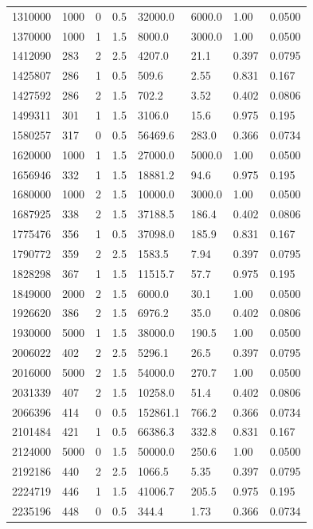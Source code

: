\documentclass[preview]{standalone}
\begin{document}
{{\begin{tabular}{L{1.2cm}C{1.2cm} C{0.3cm}C{0.5cm} C{1.4cm}C{1.4cm} C{1.4cm}C{1.4cm}}
  1310000  &  1000  & 0     & 0.5 &  32000.0  & 6000.0  & 1.00 &  0.0500   \\ 
  1370000  &  1000  & 1     & 1.5 &  8000.0  & 3000.0  & 1.00 &  0.0500   \\ 
  1412090  &   283  & 2     & 2.5 &  4207.0  & 21.1  & 0.397 &  0.0795   \\ 
  1425807  &   286  & 1     & 0.5 &  509.6  & 2.55  & 0.831 &  0.167   \\ 
  1427592  &   286  & 2     & 1.5 &  702.2  & 3.52  & 0.402 &  0.0806   \\ 
  1499311  &   301  & 1     & 1.5 &  3106.0  & 15.6  & 0.975 &  0.195   \\ 
  1580257  &   317  & 0     & 0.5 &  56469.6  & 283.0  & 0.366 &  0.0734   \\ 
  1620000  &  1000  & 1     & 1.5 &  27000.0  & 5000.0  & 1.00 &  0.0500   \\ 
  1656946  &   332  & 1     & 1.5 &  18881.2  & 94.6  & 0.975 &  0.195   \\ 
  1680000  &  1000  & 2     & 1.5 &  10000.0  & 3000.0  & 1.00 &  0.0500   \\ 
  1687925  &   338  & 2     & 1.5 &  37188.5  & 186.4  & 0.402 &  0.0806   \\ 
  1775476  &   356  & 1     & 0.5 &  37098.0  & 185.9  & 0.831 &  0.167   \\ 
  1790772  &   359  & 2     & 2.5 &  1583.5  & 7.94  & 0.397 &  0.0795   \\ 
  1828298  &   367  & 1     & 1.5 &  11515.7  & 57.7  & 0.975 &  0.195   \\ 
  1849000  &  2000  & 2     & 1.5 &  6000.0  & 30.1  & 1.00 &  0.0500   \\ 
  1926620  &   386  & 2     & 1.5 &  6976.2  & 35.0  & 0.402 &  0.0806   \\ 
  1930000  &  5000  & 1     & 1.5 &  38000.0  & 190.5  & 1.00 &  0.0500   \\ 
  2006022  &   402  & 2     & 2.5 &  5296.1  & 26.5  & 0.397 &  0.0795   \\ 
  2016000  &  5000  & 2     & 1.5 &  54000.0  & 270.7  & 1.00 &  0.0500   \\ 
  2031339  &   407  & 2     & 1.5 &  10258.0  & 51.4  & 0.402 &  0.0806   \\ 
  2066396  &   414  & 0     & 0.5 &  152861.1  & 766.2  & 0.366 &  0.0734   \\ 
  2101484  &   421  & 1     & 0.5 &  66386.3  & 332.8  & 0.831 &  0.167   \\ 
  2124000  &  5000  & 0     & 1.5 &  50000.0  & 250.6  & 1.00 &  0.0500   \\ 
  2192186  &   440  & 2     & 2.5 &  1066.5  & 5.35  & 0.397 &  0.0795   \\ 
  2224719  &   446  & 1     & 1.5 &  41006.7  & 205.5  & 0.975 &  0.195   \\ 
  2235196  &   448  & 0     & 0.5 &  344.4  & 1.73  & 0.366 &  0.0734   \\ 
\hline 
\end{tabular} 

}}
\end{document}
